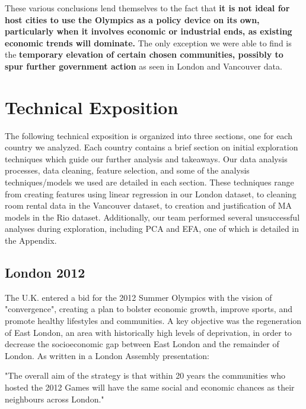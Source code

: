 \documentclass[11pt, twocolumn]{article}
\begin{document}
These various conclusions lend themselves to the fact that \textbf{it is not ideal for host cities to use the Olympics as a policy device on its own, particularly when it involves economic or industrial ends, as existing economic trends will dominate.} The only exception we were able to find is the \textbf{temporary elevation of certain chosen communities, possibly to spur further government action} as seen in London and Vancouver data. 

\section{Technical Exposition}

The following technical exposition is organized into three sections, one for each country we analyzed. Each country contains a brief section on initial exploration techniques which guide our further analysis and takeaways. Our data analysis processes, data cleaning, feature selection, and some of the analysis techniques/models we used are detailed in each section. These techniques range from creating features using linear regression in our London dataset, to cleaning room rental data in the Vancouver dataset, to creation and justification of MA models in the Rio dataset. Additionally, our team performed several unsuccessful analyses during exploration, including PCA and EFA, one of which is detailed in the Appendix.

\subsection{London 2012}

The U.K. entered a bid for the 2012 Summer Olympics with the vision of "convergence", creating a plan to bolster economic growth, improve sports, and promote healthy lifestyles and communities. A key objective was the regeneration of East London, an area with historically high levels of deprivation, in order to decrease the socioeconomic gap between East London and the remainder of London. As written in a London Assembly presentation:

\begin{displayquote}
"The overall aim of the strategy is that within 20 years the communities who hosted the 2012 Games will have the same social and economic chances as their neighbours across London."\cite{london_asm}
\end{displayquote}
\end{document}
